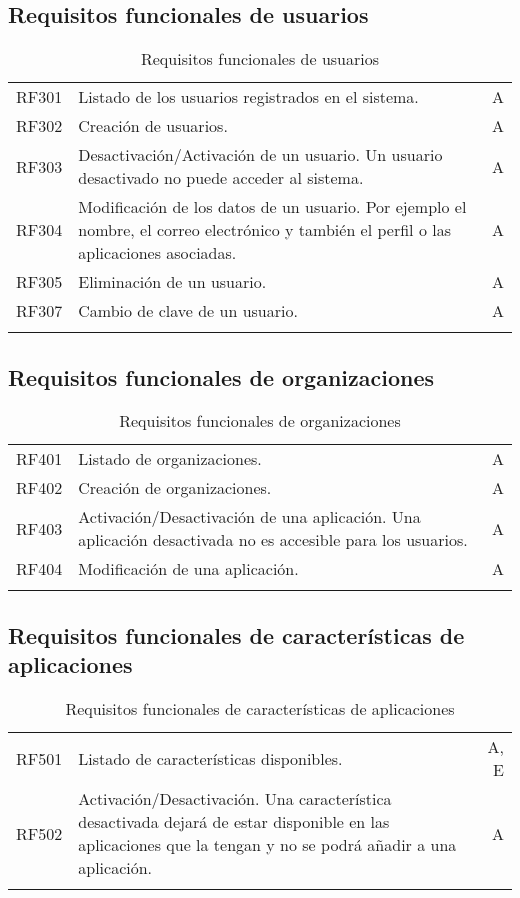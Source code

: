 \subsection{Requisitos funcionales de usuarios}
\label{cuadro:requisitos-funcionales-de-usuarios}
\begin{longtable}{l|p{13cm}|r}
  RF301\label{RF301} & Listado de los usuarios registrados en el sistema. & A \\
  RF302\label{RF302} & Creación de usuarios. & A \\
  RF303\label{RF303} & Desactivación/Activación de un usuario. Un usuario desactivado no puede acceder al sistema. & A \\
  RF304\label{RF304} & Modificación de los datos de un usuario. Por ejemplo el nombre, el correo electrónico y también el perfil o las aplicaciones asociadas. & A \\
  RF305\label{RF305} & Eliminación de un usuario. & A \\
  RF307\label{RF307} & Cambio de clave de un usuario. & A \\
  \caption{Requisitos funcionales de usuarios} \\
\end{longtable}

\subsection{Requisitos funcionales de organizaciones}
\label{cuadro:requisitos-funcionales-de-organizaciones}
\begin{longtable}{l|p{13cm}|r}
  RF401\label{RF401} & Listado de organizaciones. & A \\
  RF402\label{RF402} & Creación de organizaciones. & A \\
  RF403\label{RF403} & Activación/Desactivación de una aplicación. Una aplicación desactivada no es accesible para los usuarios. & A \\
  RF404\label{RF404} & Modificación de una aplicación. & A \\
  \caption{Requisitos funcionales de organizaciones} \\
\end{longtable}

\subsection{Requisitos funcionales de características de aplicaciones}
\label{cuadro:requisitos-funcionales-de-aplicaciones}
\begin{longtable}{l|p{13cm}|r}
  RF501\label{RF501} & Listado de características disponibles. & A, E \\
  RF502\label{RF502} & Activación/Desactivación. Una característica desactivada dejará de estar disponible en las aplicaciones que la tengan y no se podrá añadir a una aplicación. & A \\
  \caption{Requisitos funcionales de características de aplicaciones} \\
\end{longtable}

